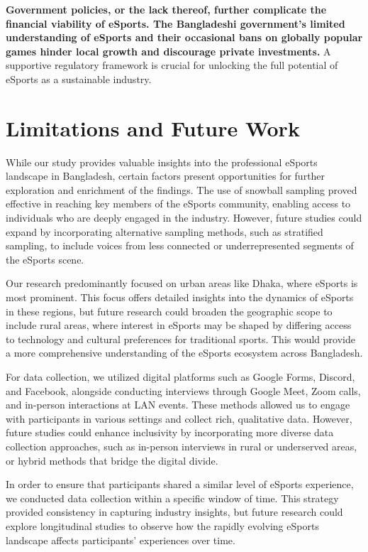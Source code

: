 \documentclass[manuscript,screen,review,anonymous]{acmart}
\begin{document}
\textbf{Government policies, or the lack thereof, further complicate the financial viability of eSports. The Bangladeshi government's limited understanding of eSports and their occasional bans on globally popular games hinder local growth and discourage private investments.} A supportive regulatory framework is crucial for unlocking the full potential of eSports as a sustainable industry.


\section{Limitations and Future Work} 

While our study provides valuable insights into the professional eSports landscape in Bangladesh, certain factors present opportunities for further exploration and enrichment of the findings. The use of snowball sampling proved effective in reaching key members of the eSports community, enabling access to individuals who are deeply engaged in the industry. However, future studies could expand by incorporating alternative sampling methods, such as stratified sampling, to include voices from less connected or underrepresented segments of the eSports scene.

Our research predominantly focused on urban areas like Dhaka, where eSports is most prominent. This focus offers detailed insights into the dynamics of eSports in these regions, but future research could broaden the geographic scope to include rural areas, where interest in eSports may be shaped by differing access to technology and cultural preferences for traditional sports. This would provide a more comprehensive understanding of the eSports ecosystem across Bangladesh.

For data collection, we utilized digital platforms such as Google Forms, Discord, and Facebook, alongside conducting interviews through Google Meet, Zoom calls, and in-person interactions at LAN events. These methods allowed us to engage with participants in various settings and collect rich, qualitative data. However, future studies could enhance inclusivity by incorporating more diverse data collection approaches, such as in-person interviews in rural or underserved areas, or hybrid methods that bridge the digital divide.

In order to ensure that participants shared a similar level of eSports experience, we conducted data collection within a specific window of time. This strategy provided consistency in capturing industry insights, but future research could explore longitudinal studies to observe how the rapidly evolving eSports landscape affects participants’ experiences over time.
\end{document}
